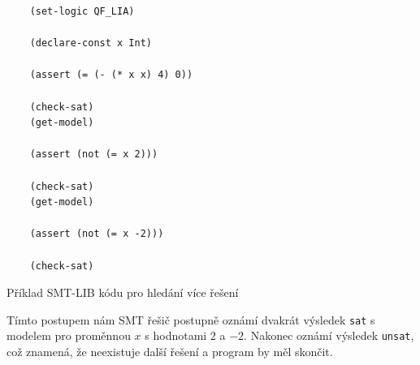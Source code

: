 \begin{listing}[H]
    \begin{verbatim}
    (set-logic QF_LIA)

    (declare-const x Int)

    (assert (= (- (* x x) 4) 0))

    (check-sat)
    (get-model)

    (assert (not (= x 2)))

    (check-sat)
    (get-model)

    (assert (not (= x -2)))

    (check-sat)
    \end{verbatim}
    \caption{Příklad SMT-LIB kódu pro hledání více řešení}
    \label{lst:smt-lib-example-sqrt}
\end{listing}

Tímto postupem nám SMT řešič postupně oznámí dvakrát výsledek \texttt{sat} s modelem pro proměnnou $x$ s hodnotami $2$ a $-2$.
Nakonec oznámí výsledek \texttt{unsat}, což znamená, že neexistuje další řešení a program by měl skončit.
